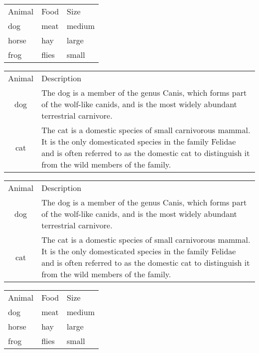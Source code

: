 \documentclass{article}
\begin{document}
\begin{tabular}{lll}
  Animal & Food  & Size   \\
  dog    & meat  & medium \\
  horse  & hay   & large  \\
  frog   & flies & small  \\
\end{tabular}

\vspace{1cm}


\begin{tabular}{cl}
  Animal & Description \\
  dog    & The dog is a member of the genus Canis, which forms part of the
           wolf-like canids, and is the most widely abundant terrestrial
           carnivore. \\
  cat    & The cat is a domestic species of small carnivorous mammal. It is the
           only domesticated species in the family Felidae and is often referred
           to as the domestic cat to distinguish it from the wild members of the
           family. \\
\end{tabular}

\vspace{1cm}

\begin{tabular}{cp{9cm}}
  Animal & Description \\
  dog    & The dog is a member of the genus Canis, which forms part of the
           wolf-like canids, and is the most widely abundant terrestrial
           carnivore. \\
  cat    & The cat is a domestic species of small carnivorous mammal. It is the
           only domesticated species in the family Felidae and is often referred
           to as the domestic cat to distinguish it from the wild members of the
           family. \\
\end{tabular}

\vspace{1cm}

\begin{tabular}{*{3}{l}}
  Animal & Food  & Size   \\
  dog    & meat  & medium \\
  horse  & hay   & large  \\
  frog   & flies & small  \\
\end{tabular}
\end{document}
